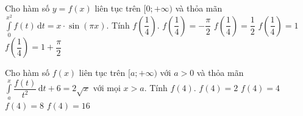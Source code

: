 \begin{ex}%
	Cho hàm số $y=f(x)$ liên tục trên $[0;+\infty)$ và thỏa mãn $\displaystyle\int\limits_0^{x^2} f(t)\mathrm{\,d}t=x\cdot\sin(\pi x)$. Tính $f\left(\dfrac{1}{4}\right)$. 
	\choice
	{$f\left(\dfrac{1}{4}\right)=-\dfrac{\pi}{2}$}
	{$f\left(\dfrac{1}{4}\right)=\dfrac{1}{2}$}
	{\True $f\left(\dfrac{1}{4}\right)=1$}
	{$f\left(\dfrac{1}{4}\right)=1+\dfrac{\pi}{2}$}
\end{ex}
\begin{ex}%
	Cho hàm số $f(x)$ liên tục trên $[a;+\infty)$ với $a>0$ và thỏa mãn $\displaystyle\int\limits_a^x\dfrac{f(t)}{t^2}\mathrm{\,d}t+6=2\sqrt{x}$ với mọi $x>a$. Tính $f(4)$. 
	\choice
	{$f(4)=2$}
	{$f(4)=4$}
	{\True $f(4)=8$}
	{$f(4)=16$}
\end{ex}
